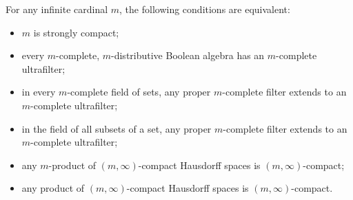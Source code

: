 For any infinite cardinal $m$, the following conditions are equivalent:
\begin{itemize}
\item[(i)] $m$ is strongly compact;
\item[(ii)] every $m$-complete, $m$-distributive Boolean algebra has an $m$-complete ultrafilter;
\item[(iii)] in every $m$-complete field of sets, any proper $m$-complete filter extends to an $m$-complete ultrafilter;
\item[(iv)] in the field of all subsets of a set, any proper $m$-complete filter extends to an $m$-complete ultrafilter;
\item[(v)] any $m$-product of $(m, \infty)$-compact Hausdorff spaces is $(m, \infty)$-compact;
\item[(vi)] any product of $(m, \infty)$-compact Hausdorff spaces is $(m, \infty)$-compact.
\end{itemize}
